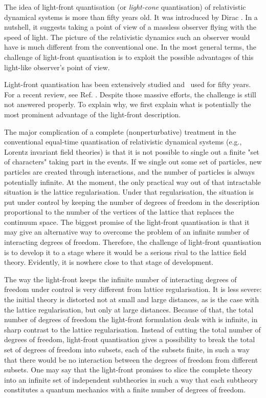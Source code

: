 \documentclass[a4paper,12pt]{article}
\begin{document}
The idea of light-front quantisation (or {\it light-cone} quantisation) 
of  relativistic dynamical systems is more than fifty years old. 
It was introduced by Dirac \cite{Dirac}. In a nutshell, it suggests 
taking a point of view of a massless observer 
flying with the speed of light. 
The picture of the relativistic dynamics such an observer would have 
is much different from the 
conventional one. In the most general terms, the challenge of light-front 
quantisation is to exploit the possible advantages of this  
light-like observer's point of view.

Light-front quantisation has been extensively studied and \
used for fifty years. For a recent review, 
see Ref. \cite{Brodsky}.
Despite those massive efforts, the challenge is still not 
answered properly. To explain why, we first explain what is 
potentially the most prominent advantage 
of the light-front description.

The major complication of a complete (nonperturbative) treatment in the 
conventional equal-time quantisation of 
relativistic dynamical systems (e.g., Lorentz invariant field theories) 
is that it is not possible to single out a finite "set of characters" taking 
part in the events. If we single out some set of particles, 
new particles are created through interactions, and 
the number of particles is always potentially infinite.
At the moment, the only practical way out of that intractable 
situation is the lattice regularisation. 
Under that regularisation, the situation is put under control by 
keeping the number of degrees of freedom in the description 
proportional to the 
number of the vertices of the lattice that replaces
the continuum space. The biggest promise of the light-front 
quantisation is that it 
may give an alternative way to overcome the problem of 
an infinite number of 
interacting degrees of freedom. Therefore, the challenge of 
light-front quantisation is to develop it to a stage where 
it would be a serious rival to the lattice field theory. 
Evidently, it is nowhere close to that stage of
development.

The way the light-front keeps the infinite 
number of interacting 
degrees of freedom under control is very different from lattice 
regularisation. It is less severe: the initial theory 
is distorted
not at small and large distances, as is the case with 
the lattice regularisation, 
but only at large distances. Because of that, the total 
number of degrees of freedom
the light-front formulation deals with is infinite, in sharp contrast to the
lattice regularisation. Instead of cutting the total number of degrees of 
freedom, light-front quantisation gives a possibility to break the total 
set of degrees of freedom into 
subsets, each of the 
subsets finite, in such a way that
there would be no interaction between the degrees of freedom from different 
subsets. One may say that the light-front promises to slice 
the complete theory into an
infinite set of independent subtheories in such a way that 
each subtheory constitutes 
a quantum mechanics with a finite number of degrees of freedom.
\end{document}
